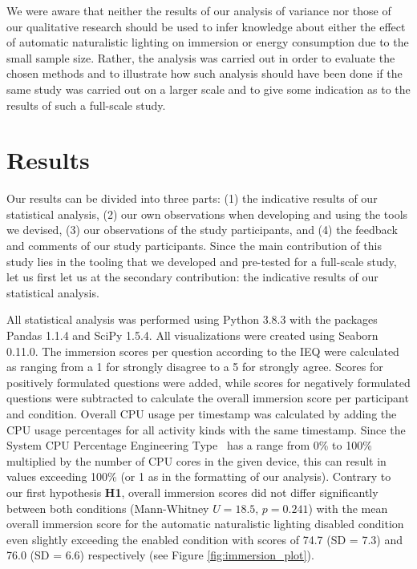\documentclass[12pt,twoside,english]{article}
\begin{document}
We were aware that neither the results of our analysis of variance nor those of our qualitative research should be used to infer knowledge about either the effect of automatic naturalistic lighting on immersion or energy consumption due to the small sample size.
Rather, the analysis was carried out in order to evaluate the chosen methods and to illustrate how such analysis should have been done if the same study was carried out on a larger scale and to give some indication as to the results of such a full-scale study.

\section{Results}
\label{sect:results}

Our results can be divided into three parts: (1) the indicative results of our statistical analysis, (2) our own observations when developing and using the tools we devised, (3) our observations of the study participants, and (4) the feedback and comments of our study participants.
Since the main contribution of this study lies in the tooling that we developed and pre-tested for a full-scale study, let us first let us at the secondary contribution: the indicative results of our statistical analysis.

All statistical analysis was performed using Python 3.8.3 with the packages Pandas 1.1.4 and SciPy 1.5.4.
All visualizations were created using Seaborn 0.11.0.
The immersion scores per question according to the \gls{IEQ} were calculated as ranging from a 1 for strongly disagree to a 5 for strongly agree.
Scores for positively formulated questions were added, while scores for negatively formulated questions were subtracted to calculate the overall immersion score per participant and condition.
Overall \gls{CPU} usage per timestamp was calculated by adding the \gls{CPU} usage percentages for all activity kinds with the same timestamp.
Since the System CPU Percentage Engineering Type~\cite{apple_system_2020} has a range from 0\% to 100\% multiplied by the number of \gls{CPU} cores in the given device, this can result in values exceeding 100\% (or 1 as in the formatting of our analysis).
Contrary to our first hypothesis \textbf{H1}, overall immersion scores did not differ significantly between both conditions (Mann-Whitney $ U = 18.5 $, $ p = 0.241 $) with the mean overall immersion score for the automatic naturalistic lighting disabled condition even slightly exceeding the enabled condition with scores of 74.7 (SD = 7.3) and 76.0 (SD = 6.6) respectively (see Figure \ref{fig:immersion_plot}).
\end{document}
